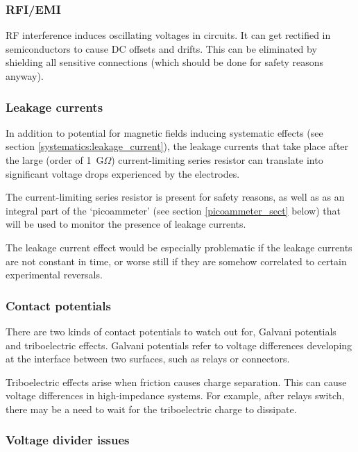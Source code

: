 \subsubsection{RFI/EMI}

RF interference induces oscillating voltages in circuits. It can get rectified
in semiconductors to cause DC offsets and drifts. This can be eliminated by
shielding all sensitive connections (which should be done for safety reasons
anyway).

\subsubsection{Leakage currents}

In addition to potential for magnetic fields inducing systematic effects (see
section \ref{systematics:leakage_current}), the leakage currents that take place
after the large (order of 1~G$\Omega$) current-limiting series resistor can
translate into significant voltage drops experienced by the electrodes.

The current-limiting series resistor is present for safety reasons, as well as
as an integral part of the `picoammeter' (see section \ref{picoammeter_sect}
below) that will be used to monitor the presence of leakage currents.

The leakage current effect would be especially problematic if the leakage
currents are not constant in time, or worse still if they are somehow correlated
to certain experimental reversals.

\subsubsection{Contact potentials}

There are two kinds of contact potentials to watch out for, Galvani potentials
and triboelectric effects. Galvani potentials refer to voltage differences
developing at the interface between two surfaces, such as relays or connectors.

Triboelectric effects arise when friction causes charge separation. This can
cause voltage differences in high-impedance systems. For example, after relays
switch, there may be a need to wait for the triboelectric charge to dissipate.

\subsubsection{Voltage divider issues}

